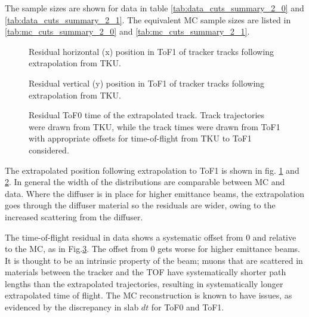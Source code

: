 The sample sizes are shown for data in table \ref{tab:data_cuts_summary_2_0} and
\ref{tab:data_cuts_summary_2_1}. The equivalent MC sample sizes are listed in 
\ref{tab:mc_cuts_summary_2_0} and \ref{tab:mc_cuts_summary_2_1}.


\let\splitcell\undefined

\let\splitcell\undefined

\let\splitcell\undefined

\begin{figure}[!tbh]
    \centering
    {Residual horizontal (x) position in ToF1 of tracker tracks following extrapolation from TKU. \label{fig:tof1_extrapolated_x}}
\end{figure}

\begin{figure}[!tbh]
    \centering
    {Residual vertical (y) position in ToF1 of tracker tracks following extrapolation from TKU. \label{fig:tof1_extrapolated_y}}
\end{figure}

\begin{figure}[!tbh]
    \centering
    {Residual ToF0 time of the extrapolated track. Track trajectories were drawn from TKU, while the track times were
    drawn from ToF1 with appropriate offsets for time-of-flight from TKU to ToF1 considered. \label{fig:tof0_extrapolated_t}}
\end{figure}

The extrapolated position following extrapolation to ToF1 is shown in fig.
\ref{fig:tof1_extrapolated_x} and \ref{fig:tof1_extrapolated_y}. In general the width 
of the distributions are comparable between MC and data. Where the diffuser is in
place for higher emittance beams, the extrapolation goes through the diffuser
material so the residuals are wider, owing to the increased scattering from the
diffuser.

The time-of-flight residual in data shows a systematic offset from 0 and relative to the
MC, as in Fig.\ref{fig:tof0_extrapolated_t}. The offset from 0 gets worse for higher emittance beams. It is thought to be
an intrinsic property of the beam; muons that are scattered in materials between 
the tracker and the TOF have systematically shorter path lengths than the 
extrapolated trajectories, resulting in systematically longer extrapolated time
of flight. The MC reconstruction is known to have issues, as evidenced by the 
discrepancy in slab $dt$ for ToF0 and ToF1.

